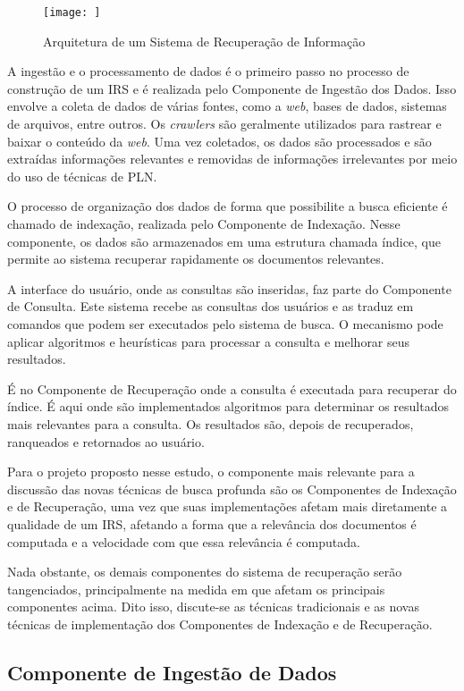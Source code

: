 \documentclass[
	12pt,				%
	openright,			%
	oneside,			%
	a4paper,			%
	english,			%
	french,				%
	spanish,			%
	brazil				%
	]{abntex2}
\begin{document}
\begin{figure}
    \centering
    \texttt{[image: ]}
    \caption{Arquitetura de um Sistema de Recuperação de Informação}
    \label{fig:irs-arquitetura}
\end{figure}

A ingestão e o processamento de dados é o primeiro passo no processo de construção de um IRS e é realizada pelo Componente de Ingestão dos Dados.
Isso envolve a coleta de dados de várias fontes, como a \textit{web}, bases de dados, sistemas de arquivos, entre outros.
Os \textit{crawlers} são geralmente utilizados para rastrear e baixar o conteúdo da \textit{web}.
Uma vez coletados, os dados são processados e são extraídas informações relevantes e removidas de informações irrelevantes por meio do uso de técnicas de PLN.

O processo de organização dos dados de forma que possibilite a busca eficiente é chamado de indexação,
realizada pelo Componente de Indexação.
Nesse componente, os dados são armazenados em uma estrutura chamada índice, que permite ao sistema recuperar
rapidamente os documentos relevantes.

A interface do usuário, onde as consultas são inseridas, faz parte do Componente de Consulta.
Este sistema recebe as consultas dos usuários e as traduz em comandos que podem ser executados pelo sistema de busca.
O mecanismo pode aplicar algoritmos e heurísticas para processar a consulta e melhorar seus resultados.

É no Componente de Recuperação onde a consulta é executada para recuperar do índice.
É aqui onde são implementados algoritmos para determinar os resultados mais relevantes para a consulta.
Os resultados são, depois de recuperados, ranqueados e retornados ao usuário.

Para o projeto proposto nesse estudo, o componente mais relevante para a discussão das novas técnicas de busca profunda são os Componentes de Indexação e de Recuperação, uma vez que suas implementações afetam mais diretamente a qualidade de um IRS, afetando a forma que a relevância dos documentos é computada e a velocidade com que essa relevância é computada.

Nada obstante, os demais componentes do sistema de recuperação serão tangenciados, principalmente na medida em que afetam os principais componentes acima. Dito isso, discute-se as técnicas tradicionais e as novas técnicas de implementação dos Componentes de Indexação e de Recuperação.

\subsection{Componente de Ingestão de Dados}\label{}
\end{document}
